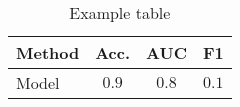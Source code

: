 \lipsum[2]
\begin{table}[ht]
    \centering
    \caption{\centering Example table}
    \label{tab:defence}
    \begin{tabular}{|l||c|c|c||}
        \hline
        Method & Acc. & AUC & F1 \\
        \hline
        Model & $0.9$ & $0.8$ & $0.1$\\
        \hline
    \end{tabular}
\end{table}